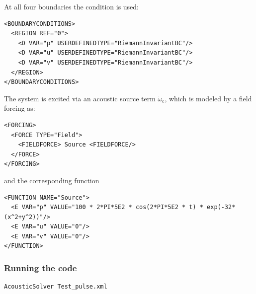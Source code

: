 At all four boundaries the  condition is used:
\begin{lstlisting}[style=XMLStyle]
<BOUNDARYCONDITIONS>
  <REGION REF="0">
    <D VAR="p" USERDEFINEDTYPE="RiemannInvariantBC"/>
    <D VAR="u" USERDEFINEDTYPE="RiemannInvariantBC"/>
    <D VAR="v" USERDEFINEDTYPE="RiemannInvariantBC"/>
  </REGION>
</BOUNDARYCONDITIONS>
\end{lstlisting}

The system is excited via an acoustic source term $\dot{\omega}_{\mathrm{c}}$, which is modeled by a field forcing as:
\begin{lstlisting}[style=XMLStyle]
<FORCING>
  <FORCE TYPE="Field">
    <FIELDFORCE> Source <FIELDFORCE/>
  </FORCE>
</FORCING>
\end{lstlisting}
and the corresponding function
\begin{lstlisting}[style=XMLStyle]
<FUNCTION NAME="Source">
  <E VAR="p" VALUE="100 * 2*PI*5E2 * cos(2*PI*5E2 * t) * exp(-32*(x^2+y^2))"/>
  <E VAR="u" VALUE="0"/>
  <E VAR="v" VALUE="0"/>
</FUNCTION>
\end{lstlisting}

\subsubsection{Running the code}
\begin{lstlisting}[style=BashInputStyle]
AcousticSolver Test_pulse.xml
\end{lstlisting}

